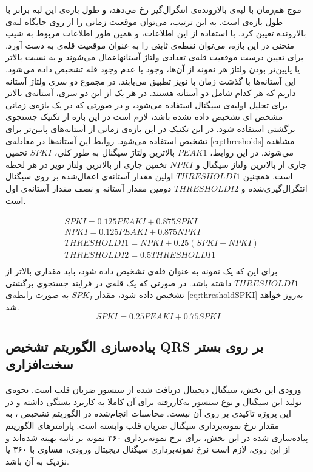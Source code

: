 موج  هم‌زمان با لبه‌ی بالارونده‌ی انتگرال‌گیر رخ می‌دهد، و طول بازه‌ی این لبه برابر با طول بازه‌ی  است. به این ترتیب، می‌توان موقعیت زمانی  را از روی جایگاه لبه‌ی بالارونده تعیین کرد. با استفاده از این اطلاعات، و همین طور اطلاعات مربوط به شیب منحنی  در این بازه، می‌توان نقطه‌ی ثابتی را به عنوان موقعیت قله‌ی  به دست آورد.
برای تعیین درست موقعیت قله‌ی  تعدادی ولتاژ آستانهاعمال می‌شوند و به نسبت بالاتر یا پایین‌تر بودن ولتاژ هر نمونه از آن‌ها، وجود یا عدم وجود قله تشخیص داده می‌شود. این آستانه‌ها با گذشت زمان با نویز تطبیق می‌یابند. در مجموع دو سری ولتاژ آستانه داریم که هر کدام شامل دو آستانه هستند. در هر یک از این دو سری، آستانه‌ی بالاتر برای تحلیل اولیه‌ی سیگنال استفاده می‌شود، و در صورتی که در یک بازه‌ی زمانی مشخص  ای تشخیص داده نشده باشد، لازم است در این بازه از تکنیک جستجوی برگشتی استفاده شود. در این تکنیک در این بازه‌ی زمانی  از آستانه‌های پایین‌تر برای تشخیص  استفاده می‌شود. روابط این آستانه‌ها در معادله‌ی \ref{eq:thresholds} مشاهده می‌شوند. در این روابط، $PEAK1$ بالاترین ولتاژ سیگنال به طور کلی، $SPKI$ تخمین جاری از بالاترین ولتاژ سیگنال و $NPKI$ تخمین جاری از بالاترین ولتاژ نویز در هر لحظه است. همچنین $THRESHOLD I1$ اولین مقدار آستانه‌ی اعمال‌شده بر روی سیگنال انتگرال‌گیری‌شده و $THRESHOLD I2$ دومین مقدار آستانه و نصف مقدار آستانه‌ی اول است.

\begin{align}
\begin{split}
	& SPKI = 0.125 PEAKI + 0.875 SPKI\\
	& NPKI = 0.125 PEAKI + 0.875 NPKI\\
	& THRESHOLD I1 = NPKI + 0.25(SPKI - NPKI)\\
	& THRESHOLD I2 = 0.5 THRESHOLD I1\\
\end{split}
\label{eq:integrator}
\end{align}
برای این که یک نمونه به عنوان قله‌ی  تشخیص داده شود، باید مقداری بالاتر از $THRESHOLD I1$ داشته باشد. در صورتی که یک قله‌ی  در فرایند جستجوی برگشتی تشخیص داده شود، مقدار $SPK_I$ به صورت رابطه‌ی \ref{eq:thresholdSPKI} به‌روز خواهد شد. 
\begin{equation}
	SPKI = 0.25 PEAKI + 0.75 SPKI
\label{eq:thresholdSPKI}
\end{equation}

	\subsection{پیاده‌سازی الگوریتم تشخیص QRS بر روی بستر سخت‌افزاری}
ورودی این بخش، سیگنال دیجیتال دریافت شده از سنسور ضربان قلب است. نحوه‌ی تولید این سیگنال و نوع سنسور به‌کاررفته برای آن کاملا به کاربرد بستگی داشته و در این پروژه تاکیدی بر روی آن نیست. محاسبات انجام‌شده در الگوریتم تشخیص ، به مقدار نرخ نمونه‌برداری سیگنال ضربان قلب وابسته است. پارامترهای الگوریتم پیاده‌سازی شده در این بخش، برای نرخ نمونه‌برداری ۳۶۰ نمونه بر ثانیه بهینه شده‌اند و از این روی، لازم است نرخ نمونه‌برداری سیگنال دیجیتال ورودی، مساوی با ۳۶۰ یا نزدیک به آن باشد.

